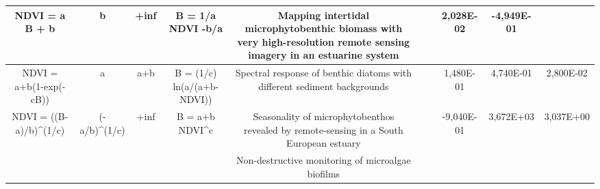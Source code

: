 \documentclass[
  letterpaper,
  DIV=11,
  numbers=noendperiod]{scrartcl}
\begin{document}
\begin{table}[]
\begin{tabular}{|cccc|ccc|ccc|}
\multicolumn{1}{|c|}{\multirow{-7}{*}{NDVI = a B + b}}       & \multicolumn{1}{c|}{\multirow{-7}{*}{b}}                 & \multicolumn{1}{c|}{\multirow{-7}{*}{+inf}}                 & \multirow{-7}{*}{B = 1/a NDVI -b/a} & \multicolumn{1}{c|}{Mapping intertidal microphytobenthic biomass with very   high-resolution remote sensing imagery in an estuarine system}                                                                               & \multicolumn{1}{c|}{}                             &         & \multicolumn{1}{c|}{2,028E-02}                 & \multicolumn{1}{c|}{-4,949E-01}                & \cellcolor[HTML]{F2F2F2} \\ \hline
\multicolumn{1}{|c|}{NDVI = a+b(1-exp(-cB))}                 & \multicolumn{1}{c|}{a}                                   & \multicolumn{1}{c|}{a+b}                                    & B = (1/c)   ln(a/(a+b-NDVI))        & \multicolumn{1}{c|}{Spectral   response of benthic diatoms with different sediment backgrounds}                                                                                                                           & \multicolumn{1}{c|}{}                             &         & \multicolumn{1}{c|}{1,480E-01}                 & \multicolumn{1}{c|}{4,740E-01}                 & 2,800E-02                \\ \hline
\multicolumn{1}{|c|}{NDVI =   ((B-a)/b)^(1/c)}               & \multicolumn{1}{c|}{(-a/b)^(1/c)}                        & \multicolumn{1}{c|}{+inf}                                   & B = a+b NDVI^c                      & \multicolumn{1}{c|}{Seasonality of   microphytobenthos revealed by remote-sensing in a South European estuary}                                                                                                            & \multicolumn{1}{c|}{}                             &         & \multicolumn{1}{c|}{-9,040E-01}                & \multicolumn{1}{c|}{3,672E+03}                 & 3,037E+00                \\ \hline
\multicolumn{1}{|c|}{}                                       & \multicolumn{1}{c|}{}                                    & \multicolumn{1}{c|}{}                                       &                                     & \multicolumn{1}{c|}{Non-destructive monitoring of   microalgae biofilms}                                                                                                                                                  & \multicolumn{1}{c|}{}                             &         & \multicolumn{1}{c|}{}                          & \multicolumn{1}{c|}{}                          & \cellcolor[HTML]{F2F2F2} \\ \cline{5-10} 

\end{tabular}
\end{table}
\end{document}
